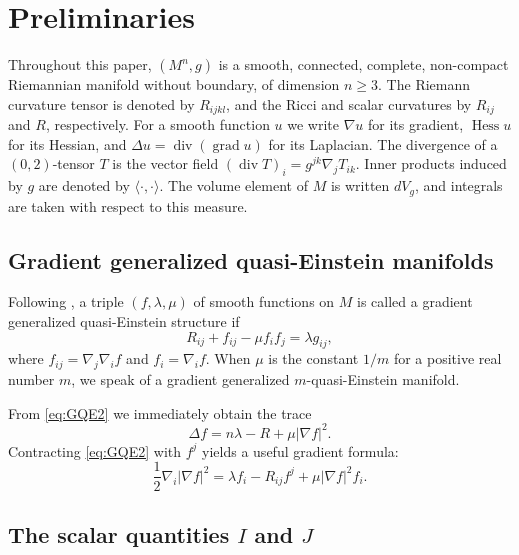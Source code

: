 \documentclass[12pt,a4paper]{article}
\newcommand{\Hess}{\operatorname{Hess}}
\newcommand{\grad}{\operatorname{grad}}
\newcommand{\divg}{\operatorname{div}}
\theoremstyle{definition}
\theoremstyle{definition}
\begin{document}
\section{Preliminaries}
\label{sec:prelim}

Throughout this paper, $(M^n,g)$ is a smooth, connected, complete, non-compact Riemannian manifold without boundary, of dimension $n\geq 3$.
The Riemann curvature tensor is denoted by $R_{ijkl}$, and the Ricci and scalar curvatures by $R_{ij}$ and $R$, respectively.
For a smooth function $u$ we write $\nabla u$ for its gradient, $\Hess u$ for its Hessian, and $\Delta u = \divg(\grad u)$ for its Laplacian.
The divergence of a $(0,2)$-tensor $T$ is the vector field $(\divg T)_i = g^{jk}\nabla_j T_{ik}$.
Inner products induced by $g$ are denoted by $\langle\cdot,\cdot\rangle$.
The volume element of $M$ is written $dV_g$, and integrals are taken with respect to this measure.

\subsection{Gradient generalized quasi-Einstein manifolds}

Following \cite{Catino,Mir14}, a triple $(f,\lambda,\mu)$ of smooth functions on $M$ is called a gradient generalized quasi-Einstein structure if
\begin{equation}
R_{ij} + f_{ij} - \mu f_i f_j = \lambda g_{ij}, \label{eq:GQE2}
\end{equation}
where $f_{ij} = \nabla_j\nabla_i f$ and $f_i = \nabla_i f$.
When $\mu$ is the constant $1/m$ for a positive real number $m$, we speak of a gradient generalized $m$-quasi-Einstein manifold.

From \eqref{eq:GQE2} we immediately obtain the trace
\begin{equation}
\Delta f = n\lambda - R + \mu|\nabla f|^2. \label{eq:trace}
\end{equation}
Contracting \eqref{eq:GQE2} with $f^j$ yields a useful gradient formula:
\begin{equation}
\frac12\nabla_i|\nabla f|^2 = \lambda f_i - R_{ij}f^j + \mu|\nabla f|^2 f_i. \label{eq:grad}
\end{equation}

\subsection{The scalar quantities $I$ and $J$}
\end{document}
